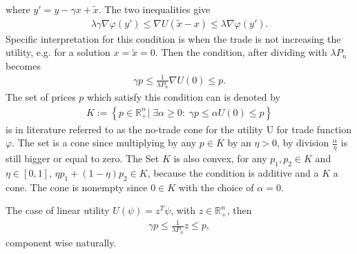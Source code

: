 where $y' = y-\gamma x + \tilde{x}$. The two inequalities give
\begin{align}
    \lambda \gamma \nabla \varphi(y') \le \nabla U(\tilde{x}-x)\le\lambda
    \nabla\varphi(y').
\end{align}
Specific interpretation for this condition is when the trade is not
increasing the utility, e.g. for a solution $x = \tilde{x} = 0$. Then the
condition, after dividing with $\lambda P_n$ becomes
\begin{align}
    \gamma p \le \frac{1}{\lambda P_n}\nabla U(0) \le p.
\end{align}
The set of prices $p$ which satisfy this condition can is denoted by
\begin{align}
    K := \left\{p \in \mathbb{R}_+^{n}| \;\exists \alpha\ge0:\; \gamma p \le \alpha U(0) \le p \right\}
\end{align}
is in literature referred to as the no-trade cone for the utility U for trade
function $\varphi$. The set is a cone since multiplying by any $p \in K$ by
an $\eta > 0$, by division $\frac{\alpha}{\eta}$ is still bigger or equal to
zero. The Set $K$ is also convex, for any $p_1, p_2 \in K$ and $\eta \in [0,
1]$, $\eta p_1 + (1-\eta)p_2 \in K$, because the condition is additive and a
$K$ a cone. The cone is nonempty since $0 \in K$ with the choice of $\alpha =
0$.

The case of linear utility $U(\psi) = z^{T} \psi$, with $z \in
\mathbb{R}_+^{n}$, then
\begin{align}
    \gamma p \le \frac{1}{\lambda P_n}z \le p,
\end{align}
component wise naturally.
